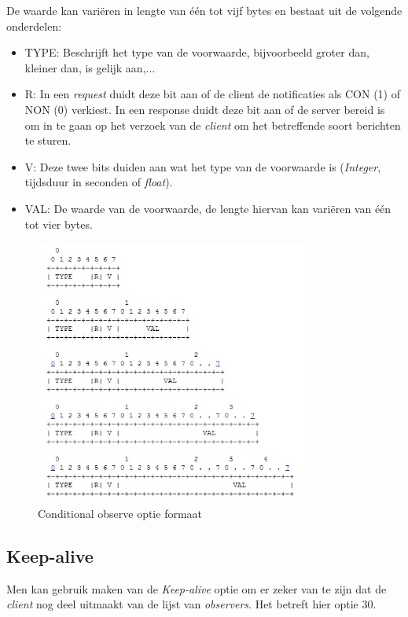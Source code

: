 De waarde kan vari\"{e}ren in lengte van \'{e}\'{e}n tot vijf bytes en bestaat uit de volgende onderdelen:
\begin{itemize}
\item TYPE: Beschrijft het type van de voorwaarde, bijvoorbeeld groter dan, kleiner dan, is gelijk aan,...
\item R: In een \textit{request} duidt deze bit aan of de client de notificaties als CON (1) of NON (0) verkiest. In een response duidt deze bit aan of de server bereid is om in te gaan op het verzoek van de \textit{client} om het betreffende soort berichten te sturen.
\item V: Deze twee bits duiden aan wat het type van de voorwaarde is (\textit{Integer}, tijdsduur in seconden of \textit{float}).
\item VAL: De waarde van de voorwaarde, de lengte hiervan kan vari\"{e}ren van \'{e}\'{e}n tot vier bytes.
\end{itemize}

\begin{figure}[h!]
\centering
\includegraphics[width=0.8\textwidth]{fig/conditional_format}
\caption{Conditional observe optie formaat}
\end{figure}

\subsection{Keep-alive}

Men kan gebruik maken van de \textit{Keep-alive} optie om er zeker van te zijn dat de \textit{client} nog deel uitmaakt van de lijst van \textit{observers}. Het betreft hier optie 30.\\

